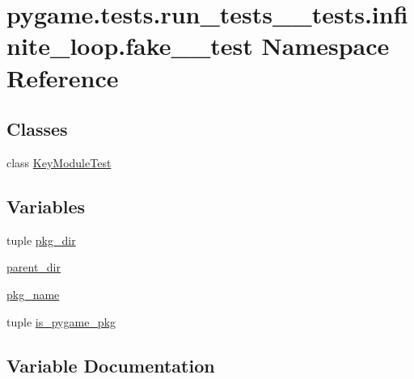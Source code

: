 \hypertarget{namespacepygame_1_1tests_1_1run__tests____tests_1_1infinite__loop_1_1fake__2__test}{}\section{pygame.\+tests.\+run\+\_\+tests\+\_\+\+\_\+tests.\+infinite\+\_\+loop.\+fake\+\_\+\_\+test Namespace Reference}
\label{namespacepygame_1_1tests_1_1run__tests____tests_1_1infinite__loop_1_1fake__2__test}
\subsection*{Classes}
\begin{DoxyCompactItemize}
\item 
class \hyperlink{classpygame_1_1tests_1_1run__tests____tests_1_1infinite__loop_1_1fake__2__test_1_1_key_module_test}{Key\+Module\+Test}
\end{DoxyCompactItemize}
\subsection*{Variables}
\begin{DoxyCompactItemize}
\item 
tuple \hyperlink{namespacepygame_1_1tests_1_1run__tests____tests_1_1infinite__loop_1_1fake__2__test_a702071f817f64b3e21a62219ba0b1613}{pkg\+\_\+dir}
\item 
\hyperlink{namespacepygame_1_1tests_1_1run__tests____tests_1_1infinite__loop_1_1fake__2__test_afd1b7dd25ce289f930b1e8b6b1370e72}{parent\+\_\+dir}
\item 
\hyperlink{namespacepygame_1_1tests_1_1run__tests____tests_1_1infinite__loop_1_1fake__2__test_a27898851bf6e0a16e9e6056dd1f871c5}{pkg\+\_\+name}
\item 
tuple \hyperlink{namespacepygame_1_1tests_1_1run__tests____tests_1_1infinite__loop_1_1fake__2__test_afefbbf5abf8d43f16311f4c63fd59f0d}{is\+\_\+pygame\+\_\+pkg}
\end{DoxyCompactItemize}


\subsection{Variable Documentation}
\mbox{\label{namespacepygame_1_1tests_1_1run__tests____tests_1_1infinite__loop_1_1fake__2__test_afefbbf5abf8d43f16311f4c63fd59f0d}} 
